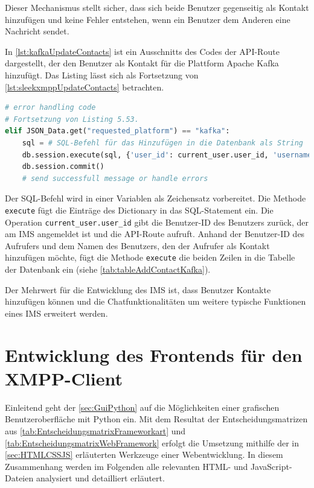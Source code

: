 \documentclass[a4paper,titlepage,halfparskip,12pt]{scrreprt}
\begin{document}
\begin{onehalfspacing}
Dieser Mechanismus stellt sicher, dass sich beide Benutzer gegenseitig als Kontakt hinzufügen und keine Fehler entstehen, wenn ein Benutzer dem Anderen eine Nachricht sendet.

In \autoref{lst:kafkaUpdateContacts} ist ein Ausschnitts des Codes der \acs{API}-Route dargestellt, der den Benutzer als Kontakt für die Plattform Apache Kafka hinzufügt. Das Listing lässt sich als Fortsetzung von \autoref{lst:sleekxmppUpdateContacts} betrachten.

\begin{lstlisting}[language=python, caption={Code für das Hinzufügen eines Kontakts der Plattform Kafka}, label={lst:kafkaUpdateContacts}]
# error handling code
# Fortsetzung von Listing 5.53.
elif JSON_Data.get("requested_platform") == "kafka":
    sql = # SQL-Befehl für das Hinzufügen in die Datenbank als String
    db.session.execute(sql, {'user_id': current_user.user_id, 'username': user_name})
    db.session.commit()
    # send successfull message or handle errors
\end{lstlisting}

Der SQL-Befehl wird in einer Variablen als Zeichensatz vorbereitet. Die Methode \texttt{execute} fügt die Einträge des Dictionary in das SQL-Statement ein. Die Operation \texttt{current\_user.user\_id} gibt die Benutzer-ID des Benutzers zurück, der am \acs{IMS} angemeldet ist und die \acs{API}-Route aufruft. Anhand der Benutzer-ID des Aufrufers und dem Namen des Benutzers, den der Aufrufer als Kontakt hinzufügen möchte, fügt die Methode \texttt{execute} die beiden Zeilen in die Tabelle der Datenbank ein (siehe \autoref{tab:tableAddContactKafka}).

Der Mehrwert für die Entwicklung des \acs{IMS} ist, dass Benutzer Kontakte hinzufügen können und die Chatfunktionalitäten um weitere typische Funktionen eines \acs{IMS} erweitert werden.

\pagebreak

\chapter{Entwicklung des Frontends für den XMPP-Client}
\label{sec:FrontendXMPP}
Einleitend geht der \autoref{sec:GuiPython} auf die Möglichkeiten einer grafischen Benutzeroberfläche mit Python ein. Mit dem Resultat der Entscheidungsmatrizen aus \autoref{tab:EntscheidungsmatrixFrameworkart} und \autoref{tab:EntscheidungsmatrixWebFramework} erfolgt die Umsetzung mithilfe der in \autoref{sec:HTMLCSSJS} erläuterten Werkzeuge einer Webentwicklung. In diesem Zusammenhang werden im Folgenden alle relevanten HTML- und JavaScript-Dateien analysiert und detailliert erläutert. 


\end{onehalfspacing}
\end{document}
